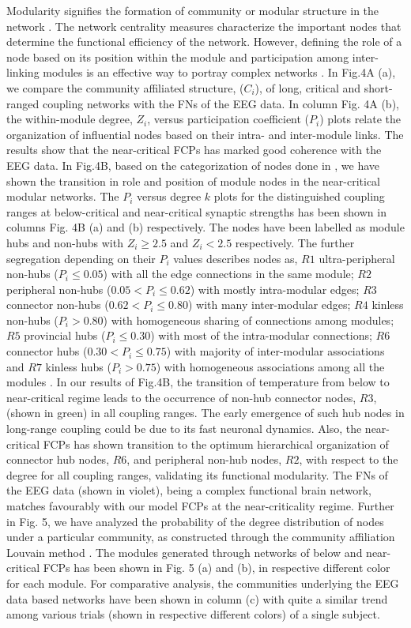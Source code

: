 \documentclass[preprintnumbers,amsmath,amssymb,onecolumn]{revtex4}
\begin{document}
{\noindent}Modularity signifies the formation of community or modular structure in the network \citep{Newman2006}. The network centrality measures characterize the important nodes that determine the functional efficiency of the network. However, defining the role of a node based on its position within the module and participation among inter-linking modules is an effective way to portray complex networks \citep{Guimera2005}. In Fig.4A (a), we compare the community affiliated structure, ($C_{i}$), of long, critical and short-ranged coupling networks with the FNs of the EEG data. In column Fig. 4A (b), the within-module degree, $Z_{i}$, versus participation coefficient ($P_{i}$) plots relate the organization of influential nodes based on their intra- and inter-module links. The results show that the near-critical FCPs has marked good coherence with the EEG data. In Fig.4B, based on the categorization of nodes done in \citep{Guimera2005}, we have shown the transition in role and position of module nodes in the near-critical modular networks. The $P_{i}$ versus degree $k$ plots for the distinguished coupling ranges at below-critical and near-critical synaptic strengths has been shown in columns Fig. 4B (a) and (b) respectively. The nodes have been labelled as module hubs and non-hubs with $Z_{i}\geq2.5$ and $Z_{i}<2.5$ respectively. The further segregation depending on their $P_{i}$ values describes nodes as, $R1$ ultra-peripheral non-hubs ($P_{i}\leq0.05$) with all the edge connections in the same module; $R2$ peripheral non-hubs ($0.05<P_{i}\leq0.62$) with mostly intra-modular edges; $R3$ connector non-hubs ($0.62<P_{i}\leq0.80$) with many inter-modular edges; $R4$ kinless non-hubs ($P_{i}>0.80$) with homogeneous sharing of connections among modules; $R5$ provincial hubs ($P_{i}\leq0.30$) with most of the intra-modular connections; $R6$ connector hubs ($0.30<P_{i}\leq0.75$) with majority of inter-modular associations and $R7$ kinless hubs ($P_{i}>0.75$) with homogeneous associations among all the modules \citep{Guimera2005}. In our results of Fig.4B, the transition of temperature from below to near-critical regime leads to the occurrence of non-hub connector nodes, $R3$, (shown in green) in all coupling ranges. The early emergence of such hub nodes in long-range coupling could be due to its fast neuronal dynamics. Also, the near-critical FCPs has shown transition to the optimum hierarchical organization of connector hub nodes, $R6$, and peripheral non-hub nodes, $R2$, with respect to the degree for all coupling ranges, validating its functional modularity. The FNs of the EEG data (shown in violet), being a complex functional brain network, matches favourably with our model FCPs at the near-criticality regime. Further in Fig. 5, we have analyzed the probability of the degree distribution of nodes under a particular community, as constructed through the community affiliation Louvain method \citep{Blondel2008}. The modules generated through networks of below and near-critical FCPs has been shown in Fig. 5 (a) and (b), in respective different color for each module. For comparative analysis, the communities underlying the EEG data based networks have been shown in column (c) with quite a similar trend among various trials (shown in respective different colors) of a single subject. 
\end{document}

